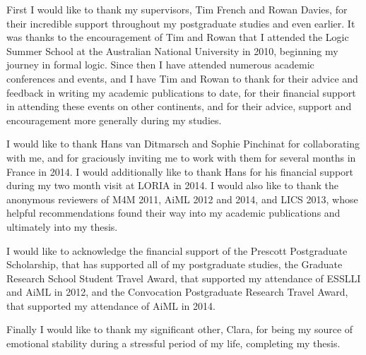 \begin{acknowledgements}

First I would like to thank my supervisors, Tim French and Rowan Davies, for their incredible support throughout my postgraduate studies and even earlier.
It was thanks to the encouragement of Tim and Rowan that I attended the Logic Summer School at the Australian National University in 2010, beginning my journey in formal logic.
Since then I have attended numerous academic conferences and events, and I have Tim and Rowan to thank for their advice and feedback in writing my academic publications to date, for their financial support in attending these events on other continents, and for their advice, support and encouragement more generally during my studies.

I would like to thank Hans van Ditmarsch and Sophie Pinchinat for collaborating with me, and for graciously inviting me to work with them for several months in France in 2014.
I would additionally like to thank Hans for his financial support during my two month visit at LORIA in 2014.
I would also like to thank the anonymous reviewers of M4M 2011, AiML 2012 and 2014, and LICS 2013, whose helpful recommendations found their way into my academic publications and ultimately into my thesis.

I would like to acknowledge the financial support of the Prescott Postgraduate Scholarship, that has supported all of my postgraduate studies, the Graduate Research School Student Travel Award, that supported my attendance of ESSLLI and AiML in 2012, and the Convocation Postgraduate Research Travel Award, that supported my attendance of AiML in 2014.

Finally I would like to thank my significant other, Clara, for being my source of emotional stability during a stressful period of my life, completing my thesis.

\end{acknowledgements}
